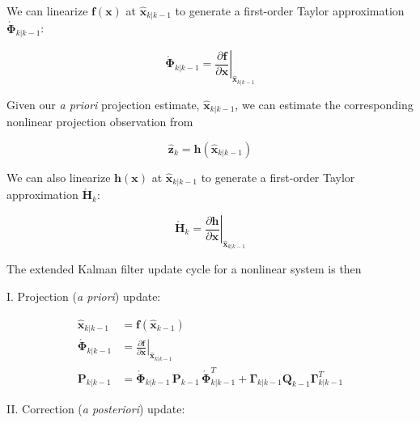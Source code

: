 We can linearize $\mathbf{f} \left( \mathbf{x} \right)$ at $\hat{\mathbf{x}}_{k|k-1}$ to
generate a first-order Taylor approximation $\mathbf{\acute{\Phi}}_{k|k-1}$:

\begin{equation*}
    \mathbf{\acute{\Phi}}_{k|k-1} = \left. \frac{\partial \mathbf{f}}{\partial \mathbf{x}} \right|_{\hat{\mathbf{x}}_{k|k-1}}
\end{equation*}

Given our \textit{a priori} projection estimate, $\hat{\mathbf{x}}_{k|k-1}$, we can
estimate the corresponding nonlinear projection observation from

\begin{equation*}
    \hat{\mathbf{z}}_{k} = \mathbf{h} \left( \hat{\mathbf{x}}_{k|k-1} \right)
\end{equation*}

We can also linearize $\mathbf{h} \left( \mathbf{x} \right)$ at $\hat{\mathbf{x}}_{k|k-1}$
to generate a first-order Taylor approximation $\mathbf{\acute{H}}_k$:

\begin{equation*}
    \mathbf{\acute{H}}_{k} = \left. \frac{\partial \mathbf{h}}{\partial \mathbf{x}} \right|_{\hat{\mathbf{x}}_{k|k-1}}
\end{equation*}

The extended Kalman filter update cycle for a nonlinear system is then

I. Projection (\textit{a priori}) update:

\begin{equation*}
    \begin{aligned}
        \hat{\mathbf{x}}_{k|k-1} &= \mathbf{f} \left( \hat{\mathbf{x}}_{k-1} \right) \\
        \mathbf{\acute{\Phi}}_{k|k-1} &= \left. \frac{\partial \mathbf{f}}{\partial \mathbf{x}} \right|_{\hat{\mathbf{x}}_{k|k-1}} \\
        \mathbf{P}_{k|k-1} &= \mathbf{\acute{\Phi}}_{k|k-1} \, \mathbf{P}_{k-1} \, \mathbf{\acute{\Phi}}_{k|k-1}^T + \mathbf{\Gamma}_{k|k-1} \mathbf{Q}_{k-1} \mathbf{\Gamma}_{k|k-1}^T
    \end{aligned}
\end{equation*}

II. Correction (\textit{a posteriori}) update:

